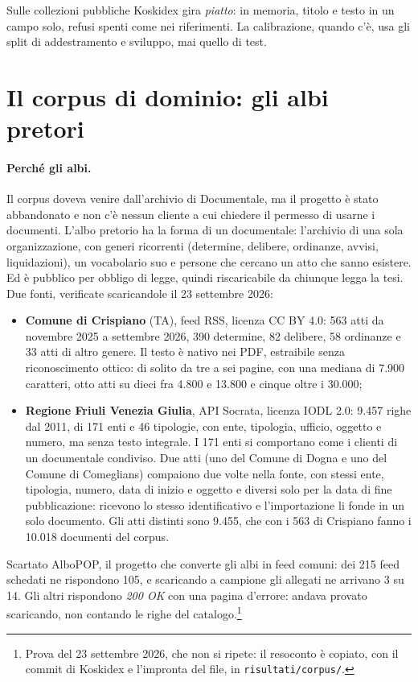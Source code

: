 Sulle collezioni pubbliche Koskidex gira \emph{piatto}: in memoria, titolo e testo
in un campo solo, refusi spenti come nei riferimenti. La calibrazione, quando
c'è, usa gli split di addestramento e sviluppo, mai quello di test.

\section{Il corpus di dominio: gli albi pretori}\label{sec:corpus}

\paragraph{Perché gli albi.} Il corpus doveva venire dall'archivio di Documentale,
ma il progetto è stato abbandonato e non c'è nessun cliente a cui chiedere il
permesso di usarne i documenti. L'albo pretorio ha la forma di un documentale:
l'archivio di una sola organizzazione, con generi ricorrenti (determine, delibere,
ordinanze, avvisi, liquidazioni), un vocabolario suo e persone che cercano un atto
che sanno esistere. Ed è pubblico per obbligo di legge, quindi riscaricabile da
chiunque legga la tesi. Due fonti, verificate scaricandole il 23 settembre 2026:
\begin{itemize}
  \item \textbf{Comune di Crispiano} (TA), feed RSS, licenza CC BY 4.0: 563 atti
        da novembre 2025 a settembre 2026, 390 determine, 82 delibere, 58
        ordinanze e 33 atti di altro genere. Il testo è nativo nei PDF, estraibile senza riconoscimento
        ottico: di solito da tre a sei pagine, con una mediana di 7.900 caratteri,
        otto atti su dieci fra 4.800 e 13.800 e cinque oltre i 30.000;
  \item \textbf{Regione Friuli Venezia Giulia}, API Socrata, licenza IODL 2.0:
        9.457 righe dal 2011, di 171 enti e 46 tipologie, con ente, tipologia,
        ufficio, oggetto e numero, ma senza testo integrale. I 171 enti si
        comportano come i clienti di un documentale condiviso. Due atti (uno del Comune
        di Dogna e uno del Comune di Comeglians) compaiono due volte nella fonte, con
        stessi ente, tipologia, numero, data di inizio e oggetto e diversi solo per la
        data di fine pubblicazione: ricevono lo stesso identificativo e l'importazione
        li fonde in un solo documento. Gli atti distinti sono 9.455, che con i 563 di
        Crispiano fanno i 10.018 documenti del corpus.
\end{itemize}
Scartato AlboPOP, il progetto che converte gli albi in feed comuni: dei 215 feed
schedati ne rispondono 105, e scaricando a campione gli allegati ne arrivano 3 su
14. Gli altri rispondono \emph{200 OK} con una pagina d'errore: andava provato
scaricando, non contando le righe del catalogo.\footnote{Prova del 23
settembre 2026, che non si ripete: il resoconto è copiato, con il commit di
Koskidex e l'impronta del file, in \texttt{risultati/corpus/}.}

